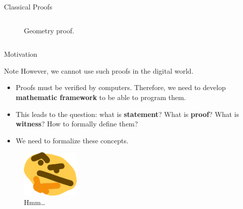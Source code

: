 \documentclass{zkdl-presentation-template}
\begin{document}
\begin{frame}{Classical Proofs}
\begin{columns}
\begin{column}{0.4\textwidth}
\begin{figure}
                    \caption{Geometry proof.}
                \end{figure}
            \end{column}
            \end{columns}
    \end{frame}

    \begin{frame}{Motivation}
        \begin{alertblock}{Note}
            However, we cannot use such proofs in the digital world. 
            
            \begin{itemize}
                \item Proofs must be verified by computers. Therefore, we need to develop \textbf{mathematic framework} to be able to program them.
                \item This leads to the question: what is \textbf{statement}? What is \textbf{proof}? What is \textbf{witness}? How to formally define them?
                \item We need to formalize these concepts.
            \end{itemize}
        \end{alertblock}

        \begin{figure}
            \centering
            \includegraphics[width=0.25\textwidth]{images/lecture_6/thonk.png}
            \caption{Hmm\ldots}
        \end{figure}
    \end{frame}
\end{document}
